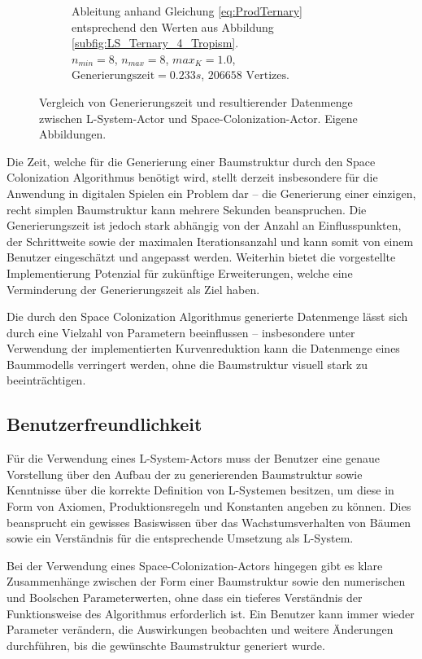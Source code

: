 \begin{figure} [hbtp]
\begin{subfigure}[t]{.45\textwidth}
		\caption{Ableitung anhand Gleichung \ref{eq:ProdTernary} entsprechend den Werten aus Abbildung \ref{subfig:LS_Ternary_4_Tropism}. \\ $n_{min} = 8$, $n_{max} = 8$, $max_K = 1.0$, \\ $\text{Generierungszeit}= 0.233s$, $206658 \text{ Vertizes}$.}
		\label{subfig:Performance_LS_Ternary_4_Tropism}
	\end{subfigure}	
	\caption{Vergleich von Generierungszeit und resultierender Datenmenge zwischen L-System-Actor und Space-Colonization-Actor. Eigene Abbildungen.}
	\label{fig:SCA_maxNG}
\end{figure}

Die Zeit, welche für die Generierung einer Baumstruktur durch den Space Colonization Algorithmus benötigt wird, stellt derzeit insbesondere für die Anwendung in digitalen Spielen ein Problem dar -- die Generierung einer einzigen, recht simplen Baumstruktur kann mehrere Sekunden beanspruchen. Die Generierungszeit ist jedoch stark abhängig von der Anzahl an Einflusspunkten, der Schrittweite sowie der maximalen Iterationsanzahl und kann somit von einem Benutzer eingeschätzt und angepasst werden. Weiterhin bietet die vorgestellte Implementierung Potenzial für zukünftige Erweiterungen, welche eine Verminderung der Generierungszeit als Ziel haben.

Die durch den Space Colonization Algorithmus generierte Datenmenge lässt sich durch eine Vielzahl von Parametern beeinflussen -- insbesondere unter Verwendung der implementierten Kurvenreduktion kann die Datenmenge eines Baummodells verringert werden, ohne die Baumstruktur visuell stark zu beeinträchtigen.

\subsection{Benutzerfreundlichkeit}

Für die Verwendung eines L-System-Actors muss der Benutzer eine genaue Vorstellung über den Aufbau der zu generierenden Baumstruktur sowie Kenntnisse über die korrekte Definition von L-Systemen besitzen, um diese in Form von Axiomen, Produktionsregeln und Konstanten angeben zu können. Dies beansprucht ein gewisses Basiswissen über das Wachstumsverhalten von Bäumen sowie ein Verständnis für die entsprechende Umsetzung als L-System. \cite[S.86]{Deussen:05}

Bei der Verwendung eines Space-Colonization-Actors hingegen gibt es klare Zusammenhänge zwischen der Form einer Baumstruktur sowie den numerischen und Boolschen Parameterwerten, ohne dass ein tieferes Verständnis der Funktionsweise des Algorithmus erforderlich ist. Ein Benutzer kann immer wieder Parameter verändern, die Auswirkungen beobachten und weitere Änderungen durchführen, bis die gewünschte Baumstruktur generiert wurde. 
 \cite[S.89]{Deussen:05}
 
